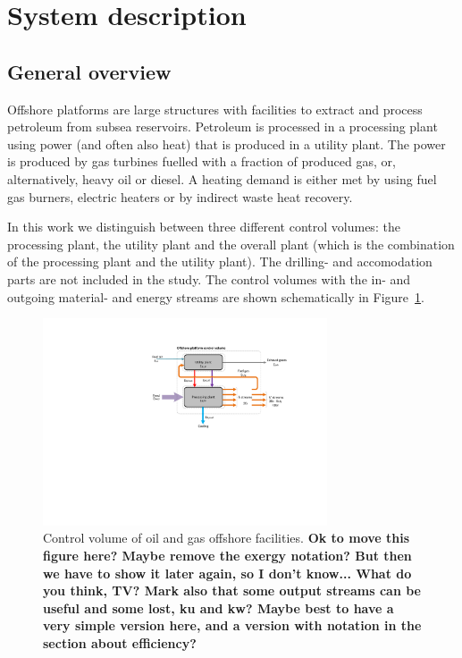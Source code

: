 \section{System description}
\label{sec:system_description}

\subsection{General overview}
\label{subsec:overview}

Offshore platforms are large structures with facilities to extract and process petroleum from subsea reservoirs. Petroleum is processed in a processing plant using power (and often also heat) that is produced in a utility plant. The power is produced by gas turbines fuelled with a fraction of produced gas, or, alternatively, heavy oil or diesel. A heating demand is either met by using fuel gas burners, electric heaters or by indirect waste heat recovery. 

In this work we distinguish between three different control volumes: the processing plant, the utility plant and the overall plant (which is the combination of the processing plant and the utility plant). The drilling- and accomodation parts are not included in the study. The control volumes with the in- and outgoing material- and energy streams are shown schematically in Figure~\ref{fig:control_volume}. 

\begin{figure}[htbp]
	\centering
	\includegraphics[width=0.75\textwidth]{control_volume.pdf}
	\caption{Control volume of oil and gas offshore facilities. \textbf{Ok to move this figure here? Maybe remove the exergy notation? But then we have to show it later again, so I don't know... What do you think, TV? Mark also that some output streams can be useful and some lost, ku and kw? Maybe best to have a very simple version here, and a version with notation in the section about efficiency?}}
	\label{fig:control_volume}
\end{figure}

